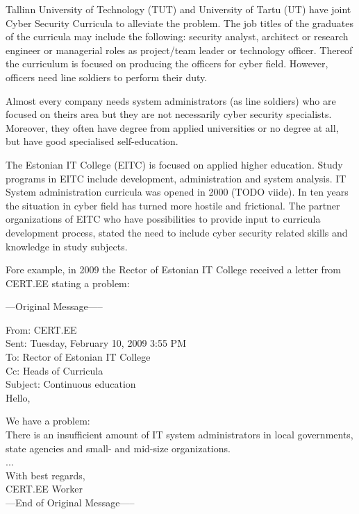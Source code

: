 Tallinn University of Technology (\gls{TUT}) and University of Tartu (\gls{UT}) have joint Cyber Security Curricula to alleviate the problem. The job titles of the graduates of the curricula may include the following: security analyst, architect or research engineer or managerial roles as project/team leader or technology officer. \citep{TUT_UT_curriculum} Thereof the curriculum is focused on producing the officers for cyber field. 
However, officers need line soldiers to perform their duty.

Almost every company needs system administrators (as line soldiers) who are focused on theirs area but they are not necessarily cyber security specialists. Moreover, they often have degree from applied universities or no degree at all, but have good specialised self-education.

The Estonian IT College (\gls{EITC}) is focused on applied higher education. Study programs in \gls{EITC} include development, administration and system analysis. IT System administration curricula was opened in 2000 {\color{red}(TODO viide)}. In ten years the situation in cyber field has turned more hostile and frictional. The partner organizations of \gls{EITC} who have possibilities to provide input to curricula development process, stated the need to include cyber security related skills and knowledge in study subjects.

Fore example, in 2009 the Rector of Estonian IT College received a letter from \gls{CERT.EE} stating a problem:\par

{
\begin{spacing}{1} 
\scriptsize
---Original Message-----

From: CERT.EE\\
Sent: Tuesday, February 10, 2009 3:55 PM\\
To: Rector of Estonian IT College\\
Cc: Heads of Curricula \\
Subject: Continuous education\\
Hello,

We have a problem:\\
There is an insufficient amount of IT system administrators in local governments, state agencies and small- and mid-size organizations.\\
...\\
With best regards,\\
CERT.EE Worker\\
---End of Original Message-----
\end{spacing}
}


